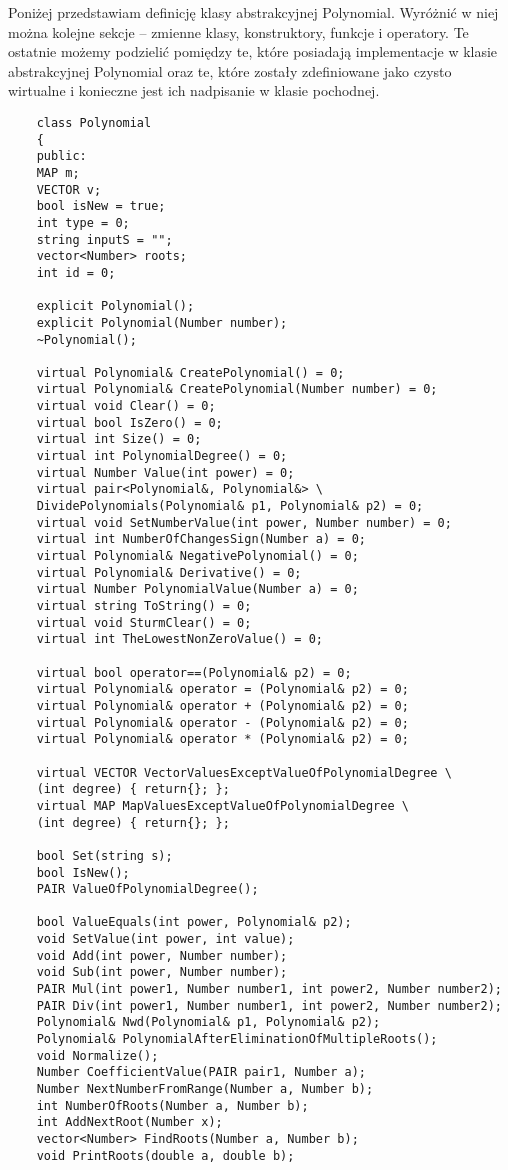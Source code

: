 \documentclass[oneside,a4paper]{book}
\begin{document}
	Poniżej przedstawiam definicję klasy abstrakcyjnej Polynomial. Wyróżnić w niej można kolejne sekcje -- zmienne klasy, konstruktory, funkcje i operatory. Te ostatnie możemy podzielić pomiędzy te, które posiadają implementacje w klasie abstrakcyjnej Polynomial oraz te, które zostały zdefiniowane jako czysto wirtualne i konieczne jest ich nadpisanie w klasie pochodnej.
	
	\begin{lstlisting}
	class Polynomial
	{
	public:
	MAP m;
	VECTOR v;
	bool isNew = true;
	int type = 0;
	string inputS = "";
	vector<Number> roots;
	int id = 0;
	
	explicit Polynomial();
	explicit Polynomial(Number number);
	~Polynomial();
	
	virtual Polynomial& CreatePolynomial() = 0;
	virtual Polynomial& CreatePolynomial(Number number) = 0;
	virtual void Clear() = 0;
	virtual bool IsZero() = 0;
	virtual int Size() = 0;
	virtual int PolynomialDegree() = 0;
	virtual Number Value(int power) = 0;
	virtual pair<Polynomial&, Polynomial&> \
	DividePolynomials(Polynomial& p1, Polynomial& p2) = 0;
	virtual void SetNumberValue(int power, Number number) = 0;
	virtual int NumberOfChangesSign(Number a) = 0;
	virtual Polynomial& NegativePolynomial() = 0;
	virtual Polynomial& Derivative() = 0;
	virtual Number PolynomialValue(Number a) = 0;
	virtual string ToString() = 0;
	virtual void SturmClear() = 0;
	virtual int TheLowestNonZeroValue() = 0;
	
	virtual bool operator==(Polynomial& p2) = 0;
	virtual Polynomial& operator = (Polynomial& p2) = 0;
	virtual Polynomial& operator + (Polynomial& p2) = 0;
	virtual Polynomial& operator - (Polynomial& p2) = 0;
	virtual Polynomial& operator * (Polynomial& p2) = 0;
	
	virtual VECTOR VectorValuesExceptValueOfPolynomialDegree \
	(int degree) { return{}; };
	virtual MAP MapValuesExceptValueOfPolynomialDegree \
	(int degree) { return{}; };
	
	bool Set(string s);
	bool IsNew();
	PAIR ValueOfPolynomialDegree();
	
	bool ValueEquals(int power, Polynomial& p2);
	void SetValue(int power, int value);
	void Add(int power, Number number);
	void Sub(int power, Number number);
	PAIR Mul(int power1, Number number1, int power2, Number number2);
	PAIR Div(int power1, Number number1, int power2, Number number2);
	Polynomial& Nwd(Polynomial& p1, Polynomial& p2);
	Polynomial& PolynomialAfterEliminationOfMultipleRoots();
	void Normalize();
	Number CoefficientValue(PAIR pair1, Number a);
	Number NextNumberFromRange(Number a, Number b);
	int NumberOfRoots(Number a, Number b);
	int AddNextRoot(Number x);
	vector<Number> FindRoots(Number a, Number b);
	void PrintRoots(double a, double b);
	

\end{lstlisting}
\end{document}
